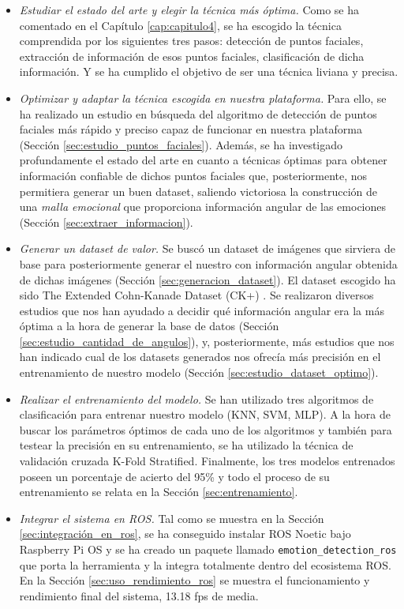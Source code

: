\begin{itemize}
    \item \textit{Estudiar el estado del arte y elegir la técnica más óptima.} Como se ha comentado en el Capítulo \ref{cap:capitulo4}, se ha escogido la técnica comprendida por los siguientes tres pasos: detección de puntos faciales, extracción de información de esos puntos faciales, clasificación de dicha información. Y se ha cumplido el objetivo de ser una técnica liviana y precisa.
    
    \item \textit{Optimizar y adaptar la técnica escogida en nuestra plataforma.} Para ello, se ha realizado un estudio en búsqueda del algoritmo de detección de puntos faciales más rápido y preciso capaz de funcionar en nuestra plataforma (Sección \ref{sec:estudio_puntos_faciales}). Además, se ha investigado profundamente el estado del arte en cuanto a técnicas óptimas para obtener información confiable de dichos puntos faciales que, posteriormente, nos permitiera generar un buen dataset, saliendo victoriosa la construcción de una \textit{malla emocional} \cite{mediapipe_emotions} que proporciona información angular de las emociones (Sección \ref{sec:extraer_informacion}).
    
    \item \textit{Generar un dataset de valor.} Se buscó un dataset de imágenes que sirviera de base para posteriormente generar el nuestro con información angular obtenida de dichas imágenes (Sección \ref{sec:generacion_dataset}). El dataset escogido ha sido The Extended Cohn-Kanade Dataset (CK+) \cite{Kanade1}\cite{Kanade2}. Se realizaron diversos estudios que nos han ayudado a decidir qué información angular era la más óptima a la hora de generar la base de datos (Sección \ref{sec:estudio_cantidad_de_angulos}), y, posteriormente, más estudios que nos han indicado cual de los datasets generados nos ofrecía más precisión en el entrenamiento de nuestro modelo (Sección \ref{sec:estudio_dataset_optimo}).
    
    \item \textit{Realizar el entrenamiento del modelo.} Se han utilizado tres algoritmos de clasificación para entrenar nuestro modelo (KNN, SVM, MLP). A la hora de buscar los parámetros óptimos de cada uno de los algoritmos y también para testear la precisión en su entrenamiento, se ha utilizado la técnica de validación cruzada K-Fold Stratified. Finalmente, los tres modelos entrenados poseen un porcentaje de acierto del 95\% y todo el proceso de su entrenamiento se relata en la Sección \ref{sec:entrenamiento}.
    
    \item \textit{Integrar el sistema en ROS.} Tal como se muestra en la Sección \ref{sec:integración_en_ros}, se ha conseguido instalar ROS Noetic bajo Raspberry Pi OS y se ha creado un paquete llamado \verb|emotion_detection_ros| que porta la herramienta y la integra totalmente dentro del ecosistema ROS. En la Sección \ref{sec:uso_rendimiento_ros} se muestra el funcionamiento y rendimiento final del sistema, 13.18 fps de media.
\end{itemize}

